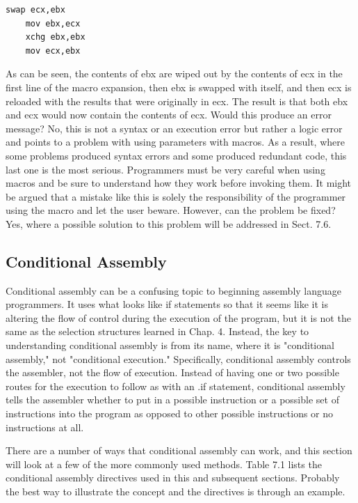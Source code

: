 \documentclass[10pt]{article}
\begin{document}
\begin{verbatim}
swap ecx,ebx
    mov ebx,ecx
    xchg ebx,ebx
    mov ecx,ebx
\end{verbatim}

As can be seen, the contents of ebx are wiped out by the contents of ecx in the first line of the macro expansion, then ebx is swapped with itself, and then ecx is reloaded with the results that were originally in ecx. The result is that both ebx and ecx would now contain the contents of ecx. Would this produce an error message? No, this is not a syntax or an execution error but rather a logic error and points to a problem with using parameters with macros. As a result, where some problems produced syntax errors and some produced redundant code, this last one is the most serious. Programmers must be very careful when using macros and be sure to understand how they work before invoking them. It might be argued that a mistake like this is solely the responsibility of the programmer using the macro and let the user beware. However, can the problem be fixed? Yes, where a possible solution to this problem will be addressed in Sect. 7.6.

\subsection*{Conditional Assembly}
Conditional assembly can be a confusing topic to beginning assembly language programmers. It uses what looks like if statements so that it seems like it is altering the flow of control during the execution of the program, but it is not the same as the selection structures learned in Chap. 4. Instead, the key to understanding conditional assembly is from its name, where it is "conditional assembly," not "conditional execution." Specifically, conditional assembly controls the assembler, not the flow of execution. Instead of having one or two possible routes for the execution to follow as with an .if statement, conditional assembly tells the assembler whether to put in a possible instruction or a possible set of instructions into the program as opposed to other possible instructions or no instructions at all.

There are a number of ways that conditional assembly can work, and this section will look at a few of the more commonly used methods. Table 7.1 lists the conditional assembly directives used in this and subsequent sections. Probably the best way to illustrate the concept and the directives is through an example.
\end{document}
